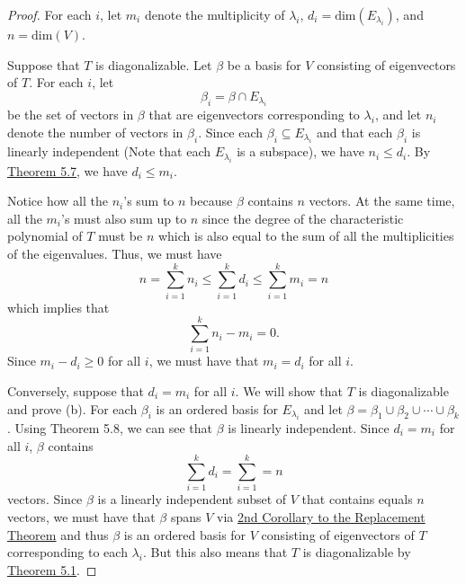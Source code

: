 \begin{proof}
For each \( i \), let \( {m}_{i} \) denote the multiplicity of \( {\lambda}_{i} \), \( {d}_{i} = \text{dim}({E}_{{\lambda}_{i}}) \), and \( n = \text{dim}(V) \). 

Suppose that \( T  \) is diagonalizable. Let \( \beta \) be a basis for \( V  \) consisting of eigenvectors of \( T  \). For each \( i \), let 
\[  {\beta}_{i} = \beta \cap {E}_{{\lambda}_{i}} \] be the set of vectors in \( \beta  \) that are eigenvectors corresponding to \( \lambda_{i} \), and let \( {n}_{i} \) denote the number of vectors in \( {\beta}_{i} \). Since each \( {\beta}_{i} \subseteq {E}_{{\lambda}_{i}} \) and that each \( {\beta}_{i} \) is linearly independent (Note that each \( {E}_{{\lambda}_{i}} \) is a subspace), we have \( {n}_{i} \leq {d}_{i} \). By {\hyperref[Theorem 5.7]{Theorem 5.7}}, we have \( {d}_{i} \leq {m}_{i} \). 

Notice how all the \( {n}_{i} \)'s sum to \( n  \) because \( \beta \) contains \( n  \) vectors. At the same time, all the \( {m}_{i} \)'s must also sum up to \( n  \) since the degree of the characteristic polynomial of \( T  \) must be \( n  \) which is also equal to the sum of all the multiplicities of the eigenvalues. Thus, we must have
\[  n = \sum_{ i=1 }^{ k  } {n}_{i} \leq \sum_{ i=1 }^{ k  } {d}_{i} \leq \sum_{ i=1 }^{ k  } {m}_{i} = n \]
which implies that
\[  \sum_{ i=1 }^{ k  } {n}_{i} - {m}_{i} = 0. \]
Since \( {m}_{i} - {d}_{i} \geq 0  \) for all \( i  \), we must have that \( {m}_{i} = {d}_{i} \) for all \( i \).

Conversely, suppose that \( {d}_{i} = {m}_{i} \) for all \( i  \). We will show that \( T  \) is diagonalizable and prove (b). For each \( {\beta}_{i} \) is an ordered basis for \( {E}_{{\lambda}_{i}} \) and let \( \beta = {\beta}_{1} \cup {\beta}_{2} \cup \cdots \cup {\beta}_{k } \). Using Theorem 5.8, we can see that \( \beta \) is linearly independent. Since \( {d}_{i} = {m}_{i} \) for all \( i \), \( \beta \) contains
\[  \sum_{ i=1 }^{ k  } {d}_{i} = \sum_{ i=1 }^{ k  } = n \]
vectors. Since \( \beta \) is a linearly independent subset of \( V  \) that contains equals \(  n  \) vectors, we must have that \( \beta \) spans \( V  \) via {\hyperref[2nd Corollary to RT]{2nd Corollary to the Replacement Theorem}} and thus \( \beta \) is an ordered basis for \( V  \) consisting of eigenvectors of \( T  \) corresponding to each \( {\lambda}_{i} \). But this also means that \( T  \) is diagonalizable by {\hyperref[Theorem 5.1]{Theorem 5.1}}.
\end{proof}


